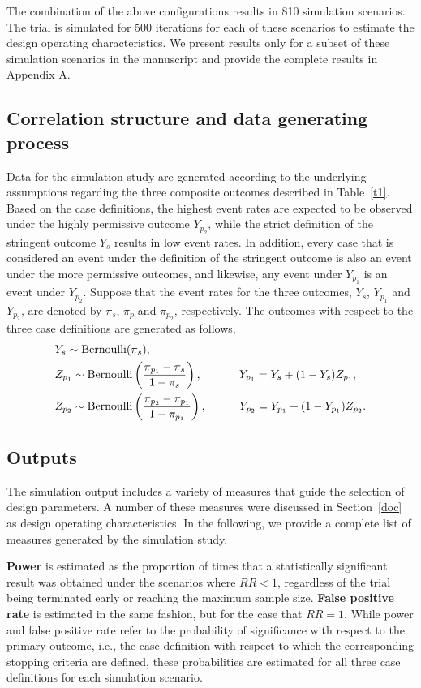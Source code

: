 \documentclass[12pt]{article}
\begin{document}
The combination of the above configurations results in 810 simulation scenarios. The trial is simulated for 500 iterations for each of these scenarios to estimate the design operating characteristics. We present results only for a subset of these simulation scenarios in the manuscript and provide the complete results in Appendix A.




\subsection{Correlation structure and data generating process
}
Data for the simulation study are generated according to the underlying assumptions regarding the three composite outcomes described in Table~\ref{t1}. Based on the case definitions, the highest event rates are expected to be observed under the highly permissive outcome $Y_{p_2}$, while the strict definition of the stringent outcome $Y_s$ results in low event rates. In addition, every case that is considered an event under the definition of the stringent outcome is also an event under the more permissive outcomes, and likewise, any event under $Y_{p_1}$ is an event under $Y_{p_2}$. Suppose that the event rates for the three outcomes, $Y_s$, $Y_{p_1}$ and $Y_{p_2}$, are denoted by $\pi_s$, $\pi_{p_1}$and $\pi_{p_2}$, respectively. The outcomes with respect to the three case definitions are generated as follows,
\begin{align}
&Y_s\sim \text{Bernoulli}( \pi_s ),
\nonumber\\
&Z_{p_1}\sim \text{Bernoulli}\left(\frac{\pi_{p_1}- \pi_s}{1-\pi_s}\right), \hskip 33pt Y_{p_1} = Y_s+(1-Y_s)Z_{p_1},  \nonumber
\\
&  Z_{p_2}\sim \text{Bernoulli}\left(\frac{\pi_{p_2}- \pi_{p_1 }}{1-\pi_{p_1 } }\right),\hskip 29ptY_{p_2} = Y_{p_1}+(1-Y_{p_1 })Z_{p_2}.
\end{align}


\subsection{Outputs}

The simulation output includes a variety of measures that guide the selection of design parameters. A number of these measures were discussed in Section~\ref{doc} as design operating characteristics. In the following, we provide a complete list of measures generated by the simulation study. 

{\bf Power} is estimated as the proportion of times that a statistically significant result was obtained under the scenarios where $RR<1$, regardless of the trial being terminated early or reaching the maximum sample size. {\bf False positive rate} is estimated in the same fashion, but for the case that $RR = 1$. While power and false positive rate refer to the probability of significance with respect to the primary outcome, i.e., the case definition with respect to which the corresponding stopping criteria are defined, these probabilities are estimated for all three case definitions for each simulation scenario.
\end{document}
